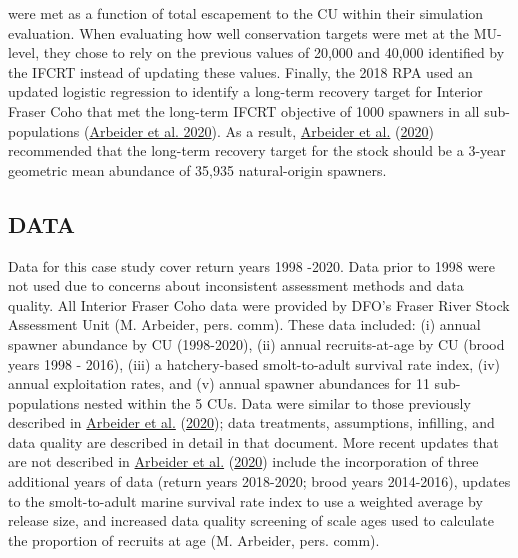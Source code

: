 \documentclass[11pt]{book}
\begin{document}
were met as a function of total escapement to the CU within their simulation evaluation. When evaluating how well conservation targets were met at the MU-level, they chose to rely on the previous values of 20,000 and 40,000 identified by the IFCRT instead of updating these values. Finally, the 2018 RPA used an updated logistic regression to identify a long-term recovery target for Interior Fraser Coho that met the long-term IFCRT objective of 1000 spawners in all sub-populations (\protect\hyperlink{ref-arbeiderInteriorFraserCoho2020}{Arbeider et al. 2020}). As a result, \protect\hyperlink{ref-arbeiderInteriorFraserCoho2020}{Arbeider et al.} (\protect\hyperlink{ref-arbeiderInteriorFraserCoho2020}{2020}) recommended that the long-term recovery target for the stock should be a 3-year geometric mean abundance of 35,935 natural-origin spawners.

\hypertarget{cohoData}{%
\subsection{DATA}\label{cohoData}}

Data for this case study cover return years 1998 -2020. Data prior to 1998 were not used due to concerns about inconsistent assessment methods and data quality. All Interior Fraser Coho data were provided by DFO's Fraser River Stock Assessment Unit (M. Arbeider, pers. comm). These data included: (i) annual spawner abundance by CU (1998-2020), (ii) annual recruits-at-age by CU (brood years 1998 - 2016), (iii) a hatchery-based smolt-to-adult survival rate index, (iv) annual exploitation rates, and (v) annual spawner abundances for 11 sub-populations nested within the 5 CUs. Data were similar to those previously described in \protect\hyperlink{ref-arbeiderInteriorFraserCoho2020}{Arbeider et al.} (\protect\hyperlink{ref-arbeiderInteriorFraserCoho2020}{2020}); data treatments, assumptions, infilling, and data quality are described in detail in that document. More recent updates that are not described in \protect\hyperlink{ref-arbeiderInteriorFraserCoho2020}{Arbeider et al.} (\protect\hyperlink{ref-arbeiderInteriorFraserCoho2020}{2020}) include the incorporation of three additional years of data (return years 2018-2020; brood years 2014-2016), updates to the smolt-to-adult marine survival rate index to use a weighted average by release size, and increased data quality screening of scale ages used to calculate the proportion of recruits at age (M. Arbeider, pers. comm).
\end{document}
